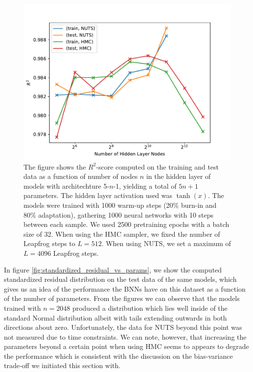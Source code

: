 \begin{figure}[H]
    \centering
    \includegraphics[scale=0.7]{figures/r2_scores/r2_score_vs_num_params_log_space.pdf}
    \caption{
        The figure shows the $R^2$-score computed on the training and test data as a function of number of nodes $n$ in the hidden layer of models with architechture 5-$n$-1, yielding a total of $5n + 1$ parameters. The hidden layer activation used was $\tanh(x)$.
        The models were trained with 1000 warm-up steps (20\% burn-in and 80\% adaptation), gathering 1000 neural networks with 10 steps between each sample. We used 2500 pretraining epochs with a batch size of 32. 
        When using the HMC sampler, we fixed the number of Leapfrog steps to $L = 512$. When using NUTS, we set a maximum of $L = 4096$ Leapfrog steps. 
    }\label{fig:r2_scores_vs_num_params}
\end{figure}



In figure \ref{fig:standardized_residual_vs_params}, we show the computed standardized residual distribution on the test data of the same models, which gives us an idea of the performance the BNNs have on this dataset as a function of the number of parameters. From the figures we can observe that the models trained with $n = 2048$ produced a distribution which lies well inside of the standard Normal distribution albeit with tails extending outwards in both directions about zero. Unfortunately, the data for NUTS beyond this point was not measured due to time constraints. We can note, however, that increasing the parameters beyond a certain point when using HMC seems to appears to degrade the performance which is consistent with the discussion on the bias-variance trade-off we initiated this section with.

